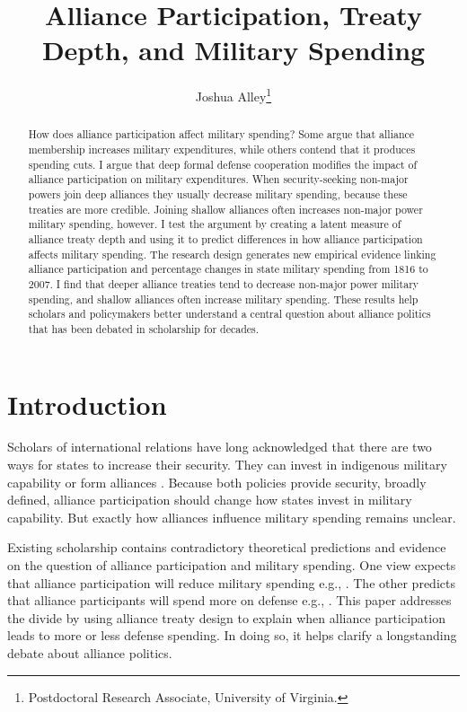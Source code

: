 \documentclass[12pt]{article}
\title{\textbf{Alliance Participation, Treaty Depth, and Military Spending}}
\author{Joshua Alley\footnote{Postdoctoral Research Associate, University of Virginia.}}
\date{}
\begin{document}
\maketitle 

\doublespace 

\begin{abstract}
How does alliance participation affect military spending? 
Some argue that alliance membership increases military expenditures, while others contend that it produces spending cuts.
I argue that deep formal defense cooperation modifies the impact of alliance participation on military expenditures.  
When security-seeking non-major powers join deep alliances they usually decrease military spending, because these treaties are more credible.
Joining shallow alliances often increases non-major power military spending, however.    
I test the argument by creating a latent measure of alliance treaty depth and using it to predict differences in how alliance participation affects military spending. 
The research design generates new empirical evidence linking alliance participation and percentage changes in state military spending from 1816 to 2007. 
I find that deeper alliance treaties tend to decrease non-major power military spending, and shallow alliances often increase military spending.  
These results help scholars and policymakers better understand a central question about alliance politics that has been debated in scholarship for decades. 
\end{abstract}


\newpage 


\section{Introduction}


Scholars of international relations have long acknowledged that there are two ways for states to increase their security. 
They can invest in indigenous military capability or form alliances \citep{Morgenthau1948, Altfield1984, Morrow1993}.
Because both policies provide security, broadly defined, alliance participation should change how states invest in military capability. 
But exactly how alliances influence military spending remains unclear. 


Existing scholarship contains contradictory theoretical predictions and evidence on the question of alliance participation and military spending. 
One view expects that alliance participation will reduce military spending e.g., \citep{BarnettLevy1991, Morrow1993, Conybeare1994}. 
The other predicts that alliance participants will spend more on defense e.g., \citep{Diehl1994, MorganPalmer2006, QuirozFlores2011}.
This paper addresses the divide by using alliance treaty design to explain when alliance participation leads to more or less defense spending. 
In doing so, it helps clarify a longstanding debate about alliance politics.
\end{document}
